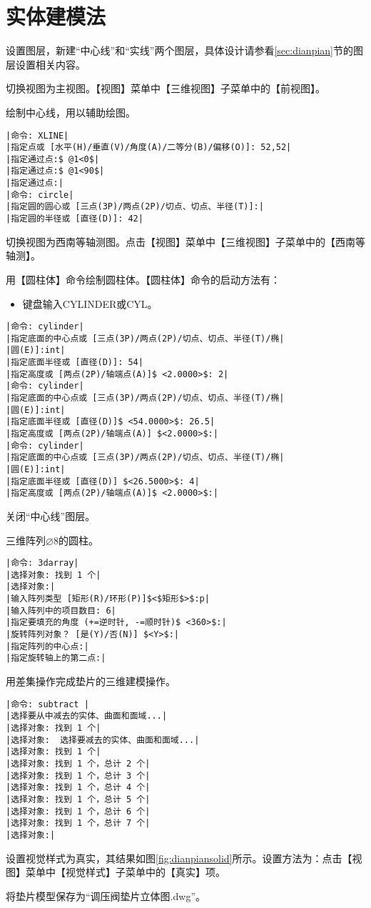 \section{实体建模法}
\begin{procedure}
\item 设置图层，新建“中心线”和“实线”两个图层，具体设计请参看\ref{sec:dianpian}节的图层设置相关内容。
\item 切换视图为主视图。【视图】菜单中【三维视图】子菜单中的【前视图】。
\item 绘制中心线，用以辅助绘图。
\begin{lstlisting}
|命令: XLINE|
|指定点或 [水平(H)/垂直(V)/角度(A)/二等分(B)/偏移(O)]: 52,52|
|指定通过点:$ @1<0$|
|指定通过点:$ @1<90$|
|指定通过点:|
|命令: circle|
|指定圆的圆心或 [三点(3P)/两点(2P)/切点、切点、半径(T)]:|
|指定圆的半径或 [直径(D)]: 42|
\end{lstlisting}
\item 切换视图为西南等轴测图。点击【视图】菜单中【三维视图】子菜单中的【西南等轴测】。
\item 用【圆柱体】命令绘制圆柱体。【圆柱体】命令的启动方法有：
\begin{itemize}
\item 键盘输入CYLINDER或CYL。
\end{itemize}
\begin{lstlisting}
|命令: cylinder|
|指定底面的中心点或 [三点(3P)/两点(2P)/切点、切点、半径(T)/椭|
|圆(E)]:int|
|指定底面半径或 [直径(D)]: 54|
|指定高度或 [两点(2P)/轴端点(A)]$ <2.0000>$: 2|
|命令: cylinder|
|指定底面的中心点或 [三点(3P)/两点(2P)/切点、切点、半径(T)/椭|
|圆(E)]:int|
|指定底面半径或 [直径(D)]$ <54.0000>$: 26.5|
|指定高度或 [两点(2P)/轴端点(A)] $<2.0000>$:|
|命令: cylinder|
|指定底面的中心点或 [三点(3P)/两点(2P)/切点、切点、半径(T)/椭|
|圆(E)]:int|
|指定底面半径或 [直径(D)] $<26.5000>$: 4|
|指定高度或 [两点(2P)/轴端点(A)]$ <2.0000>$:|
\end{lstlisting}
\item 关闭“中心线”图层。
\item 三维阵列$\diameter 8$的圆柱。
\begin{lstlisting}
|命令: 3darray|
|选择对象: 找到 1 个|
|选择对象:|
|输入阵列类型 [矩形(R)/环形(P)]$<$矩形$>$:p|
|输入阵列中的项目数目: 6|
|指定要填充的角度 (+=逆时针, -=顺时针)$ <360>$:|
|旋转阵列对象？ [是(Y)/否(N)] $<Y>$:|
|指定阵列的中心点:|
|指定旋转轴上的第二点:|
\end{lstlisting}
\item 用差集操作完成垫片的三维建模操作。
\begin{lstlisting}
|命令: subtract |
|选择要从中减去的实体、曲面和面域...|
|选择对象: 找到 1 个|
|选择对象:  选择要减去的实体、曲面和面域...|
|选择对象: 找到 1 个|
|选择对象: 找到 1 个，总计 2 个|
|选择对象: 找到 1 个，总计 3 个|
|选择对象: 找到 1 个，总计 4 个|
|选择对象: 找到 1 个，总计 5 个|
|选择对象: 找到 1 个，总计 6 个|
|选择对象: 找到 1 个，总计 7 个|
|选择对象:|
\end{lstlisting}
\item 设置视觉样式为真实，其结果如图\ref{fig:dianpiansolid}所示。设置方法为：点击【视图】菜单中【视觉样式】子菜单中的【真实】项。
\item 将垫片模型保存为“调压阀垫片立体图.dwg”。
\end{procedure}

\endinput